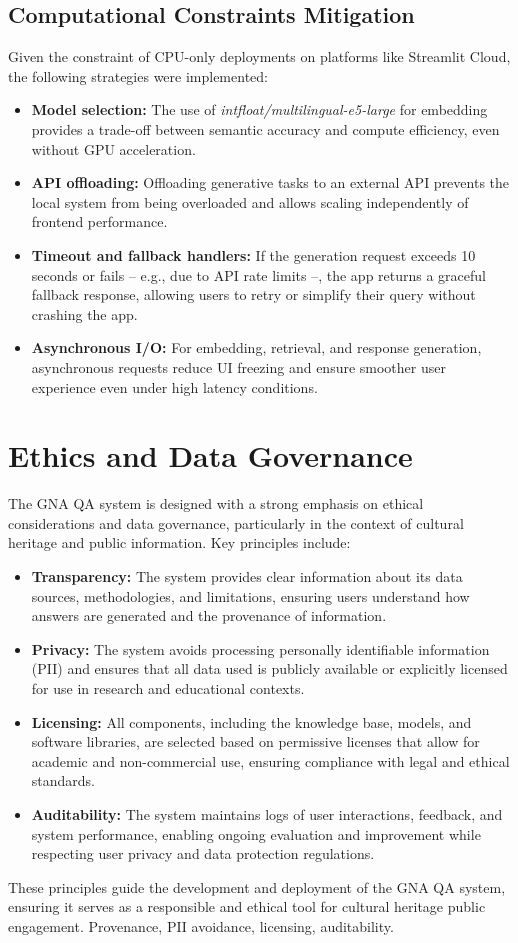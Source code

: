 \begin{spacing}{1.5}
\subsection{Computational Constraints Mitigation}
Given the constraint of CPU-only deployments on platforms like Streamlit Cloud, the following strategies were implemented:
\begin{itemize}
\item \textbf{Model selection:} The use of \textit{intfloat/multilingual-e5-large} for embedding provides a trade-off between semantic accuracy and compute efficiency, even without GPU acceleration.
\item \textbf{API offloading:} Offloading generative tasks to an external API prevents the local system from being overloaded and allows scaling independently of frontend performance.
\item \textbf{Timeout and fallback handlers:} If the generation request exceeds 10 seconds or fails -- e.g., due to API rate limits --, the app returns a graceful fallback response, allowing users to retry or simplify their query without crashing the app.
\item \textbf{Asynchronous I/O:} For embedding, retrieval, and response generation, asynchronous requests reduce UI freezing and ensure smoother user experience even under high latency conditions.
\end{itemize}


\section{Ethics and Data Governance}
The GNA QA system is designed with a strong emphasis on ethical considerations and data governance, particularly in the context of cultural heritage and public information. Key principles include:
\begin{itemize}
\item \textbf{Transparency:} The system provides clear information about its data sources, methodologies, and limitations, ensuring users understand how answers are generated and the provenance of information.
\item \textbf{Privacy:} The system avoids processing personally identifiable information (PII) and ensures that all data used is publicly available or explicitly licensed for use in research and educational contexts.
\item \textbf{Licensing:} All components, including the knowledge base, models, and software libraries, are selected based on permissive licenses that allow for academic and non-commercial use, ensuring compliance with legal and ethical standards.
\item \textbf{Auditability:} The system maintains logs of user interactions, feedback, and system performance, enabling ongoing evaluation and improvement while respecting user privacy and data protection regulations.
\end{itemize}
These principles guide the development and deployment of the GNA QA system, ensuring it serves as a responsible and ethical tool for cultural heritage public engagement.
Provenance, PII avoidance, licensing, auditability.


\end{spacing}
